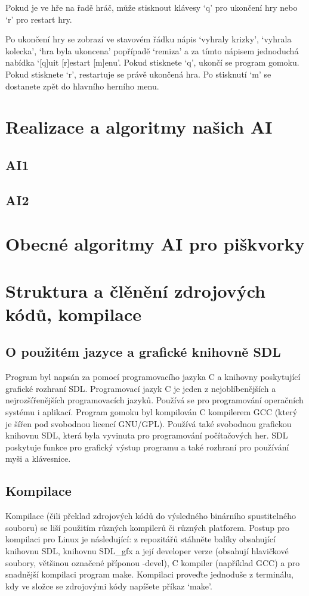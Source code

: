 \documentclass[a4paper,11pt,titlepage]{article}
\begin{document}
Pokud je ve hře na řadě hráč, může stisknout klávesy `q' pro ukončení hry nebo `r' pro restart hry.

Po ukončení hry se zobrazí ve stavovém řádku nápis `vyhraly krizky', `vyhrala kolecka', `hra byla ukoncena' popřípadě `remiza' a za tímto nápisem jednoduchá nabídka `[q]uit [r]estart [m]enu'. Pokud stisknete `q', ukončí se program gomoku. Pokud stisknete `r', restartuje se právě ukončená hra. Po stisknutí `m' se dostanete zpět do hlavního herního menu.
\newpage
\section{Realizace a algoritmy našich AI}
\subsection{AI1}
\subsection{AI2}
\section{Obecné algoritmy AI pro piškvorky}
\newpage
\section{Struktura a člěnění zdrojových kódů, kompilace}
\subsection{O použitém jazyce a grafické knihovně SDL}
Program byl napsán za pomocí programovacího jazyka C a knihovny poskytující grafické rozhraní SDL. Programovací jazyk C je jeden z nej\-ob\-lí\-be\-něj\-ších a nejrozšířenějších programovacích jazyků. Používá se pro programování operačních systému i aplikací. Program gomoku byl kompilován C kompilerem GCC (který je šířen pod svobodnou licencí GNU/GPL). Používá také svobodnou grafickou knihovnu SDL, která byla vyvinuta pro programování počítačových her. SDL poskytuje funkce pro grafický výstup programu a také rozhraní pro používání myši a klávesnice.
\subsection{Kompilace}
Kompilace (čili překlad zdrojových kódů do výsledného binárního spustitelného souboru) se liší použitím různých kompilerů či různých platforem. Postup pro kompilaci pro Linux je následující: z repozitářů stáhněte balíky obsahující knihovnu SDL, knihovnu SDL\_gfx a její developer verze (obsahují hlavičkové soubory, většinou označené příponou -devel), C kompiler (například GCC) a pro snadnější kompilaci program make. Kompilaci proveďte jednoduše z terminálu, kdy ve složce se zdrojovými kódy napíšete příkaz `make'. 
\end{document}
